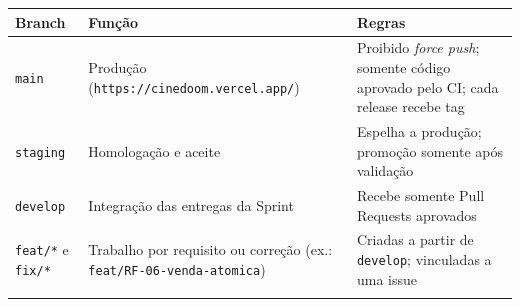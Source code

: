 {\footnotesize
\begin{tabularx}{\textwidth}{L{2.14cm} >{\hsize\sloppy\arraybackslash}X >{\hsize\sloppy\arraybackslash}X}
\toprule
{}
\textbf{Branch} & \textbf{Função} & \textbf{Regras} \\
\midrule
{}
\texttt{main} & Produção (\texttt{https:/\allowbreak{}/\allowbreak{}cinedoom.\allowbreak{}vercel.\allowbreak{}app/}) & Proibido \emph{force push}; somente código aprovado pelo CI; cada release recebe tag \\
\midrule
\texttt{staging} & Homologação e aceite & Espelha a produção; promoção somente após validação \\
\midrule
\texttt{develop} & Integração das entregas da Sprint & Recebe somente Pull Requests aprovados \\
\midrule
\texttt{feat/*} e \texttt{fix/*} & Trabalho por requisito ou correção (ex.: \texttt{feat/\allowbreak{}RF-\allowbreak{}06-\allowbreak{}venda-\allowbreak{}atomica}) & Criadas a partir de \texttt{develop}; vinculadas a uma issue \\
\bottomrule
\end{tabularx}%
}
